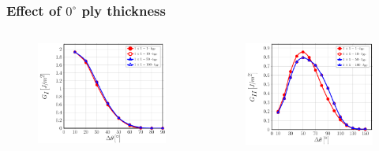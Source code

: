 \documentclass[first,firstsupp,lastsupp,last,hyperref,table]{ETHclass}
\begin{document}
\begin{frame}
\frametitle{\vspace{0.2cm}\small Effect of $0^{\circ}$ ply thickness}
\vspace{-.75cm}
\centering
\begin{columns}[c]
\centering
\begin{column}{0.5\textwidth}
\centering
\begin{figure}
\centering
\includegraphics[width=\columnwidth]{1x1-i-vf60-GI-zero.pdf}
\end{figure}
\end{column}
\begin{column}{0.5\textwidth}
\centering
\begin{figure}
\centering
\includegraphics[width=\columnwidth]{1x1-i-vf60-GII-zero.pdf}

\end{figure}
\end{column}
\end{columns}
\end{frame}
\end{document}
